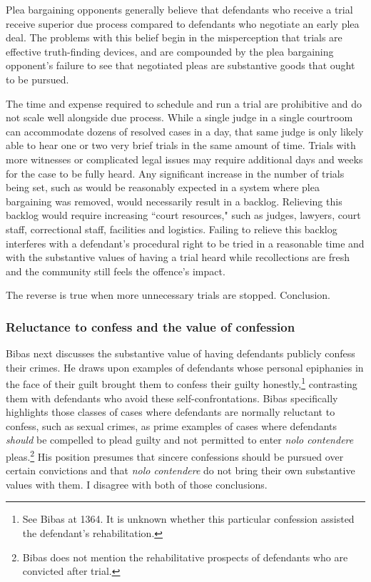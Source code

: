 Plea bargaining opponents generally believe that defendants who receive a trial receive superior due process compared to defendants who negotiate an early plea deal. The problems with this belief begin in the misperception that trials are effective truth-finding devices, and are compounded by the plea bargaining opponent's failure to see that negotiated pleas are substantive goods that ought to be pursued. 

The time and expense required to schedule and run a trial are prohibitive and do not scale well alongside due process. While a single judge in a single courtroom can accommodate dozens of resolved cases in a day, that same judge is only likely able to hear one or two very brief trials in the same amount of time. Trials with more witnesses or complicated legal issues may require additional days and weeks for the case to be fully heard. Any significant increase in the number of trials being set, such as would be reasonably expected in a system where plea bargaining was removed, would necessarily result in a backlog. Relieving this backlog would require increasing ``court resources," such as judges, lawyers, court staff, correctional staff, facilities and logistics. Failing to relieve this backlog interferes with a defendant's procedural right to be tried in a reasonable time and with the substantive values of having a trial heard while recollections are fresh and the community still feels the offence's impact. 

The reverse is true when more unnecessary trials are stopped. Conclusion.

\subsubsection{Reluctance to confess and the value of confession}

Bibas next discusses the substantive value of having defendants publicly confess their crimes. He draws upon examples of defendants whose personal epiphanies in the face of their guilt brought them to confess their guilty honestly,\footnote{See Bibas at 1364. It is unknown whether this particular confession assisted the defendant's rehabilitation.} contrasting them with defendants who avoid these self-confrontations. Bibas specifically highlights those classes of cases where defendants are normally reluctant to confess, such as sexual crimes, as prime examples of cases where defendants \textit{should} be compelled to plead guilty and not permitted to enter \textit{nolo contendere} pleas.\footnote{Bibas does not mention the rehabilitative prospects of defendants who are convicted after trial.} His position presumes that sincere confessions should be pursued over certain convictions and that \textit{nolo contendere} do not bring their own substantive values with them. I disagree with both of those conclusions.

